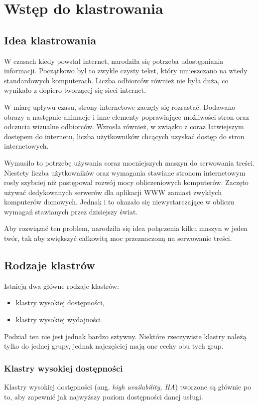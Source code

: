 \chapter{Wstęp do klastrowania}
\section{Idea klastrowania}
W czasach kiedy powstał internet, narodziła się potrzeba udostępniania informacji. Początkowo był to zwykle czysty tekst, który umieszczano na wtedy standardowych komputerach. Liczba odbiorców również nie była duża, co wynikało z dopiero tworzącej się sieci internet.

W miarę upływu czasu, strony internetowe zaczęły się rozrastać. Dodawano obrazy a następnie animacje i inne elementy poprawiające możliwości stron oraz odczucia wizualne odbiorców. Wzrosła również, w związku z coraz łatwiejszym dostępem do internetu, liczba użytkowników chcących uzyskać dostęp do stron internetowych.

Wymusiło to potrzebę używania coraz mocniejszych maszyn do serwowania treści. Niestety liczba użytkowników oraz wymagania stawiane stronom internetowym rosły szybciej niż postępował rozwój mocy obliczeniowych komputerów. Zaczęto używać dedykowanych serwerów dla aplikacji WWW zamiast zwykłych komputerów domowych. Jednak i to okazało się niewystarczające w obliczu wymagań stawianych przez dzisiejszy świat.

Aby rozwiązać ten problem, narodziła się idea połączenia kilku maszyn w jeden twór, tak aby zwiększyć całkowitą moc przeznaczoną na serwowanie treści.
\section{Rodzaje klastrów}
Istnieją dwa główne rodzaje klastrów:
\begin{itemize}
\item klastry wysokiej dostępności,
\item klastry wysokiej wydajności.
\end{itemize} 
Podział ten nie jest jednak bardzo sztywny.
Niektóre rzeczywiste klastry należą tylko do jednej grupy, jednak najczęściej mają one cechy obu tych grup.
\subsection{Klastry wysokiej dostępności}
Klastry wysokiej dostępności (ang. \textit{high availability, HA}) tworzone są głównie po to, aby zapewnić jak najwyższy poziom dostępności danej usługi.

